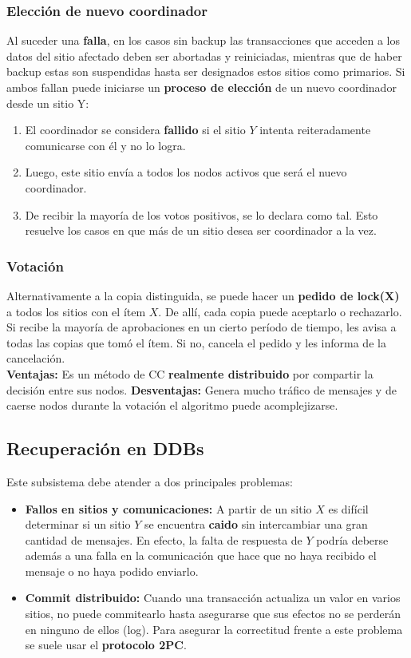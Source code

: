 \subsubsection*{Elección de nuevo coordinador}
Al suceder una \textbf{falla}, en los casos sin backup las transacciones que acceden a los datos del sitio afectado deben ser abortadas y reiniciadas, mientras que de haber backup estas son suspendidas hasta ser designados estos sitios como primarios. Si ambos fallan puede iniciarse un \textbf{proceso de elección} de un nuevo coordinador desde un sitio Y:
\begin{enumerate}
    \item El coordinador se considera \textbf{fallido} si el sitio $Y$ intenta reiteradamente comunicarse con él y no lo logra.
    \item Luego, este sitio envía a todos los nodos activos que será el nuevo coordinador.
    \item De recibir la mayoría de los votos positivos, se lo declara como tal. Esto resuelve los casos en que más de un sitio desea ser coordinador a la vez.
\end{enumerate}

\subsubsection*{Votación}
Alternativamente a la copia distinguida, se puede hacer un \textbf{pedido de lock(X)} a todos los sitios con el ítem $X$. De allí, cada copia puede aceptarlo o rechazarlo. Si recibe la mayoría de aprobaciones en un cierto período de tiempo, les avisa a todas las copias que tomó el ítem. Si no, cancela el pedido y les informa de la cancelación. \\
\textbf{Ventajas:} Es un método de CC \textbf{realmente distribuido} por compartir la decisión entre sus nodos.
\textbf{Desventajas:} Genera mucho tráfico de mensajes y de caerse nodos durante la votación el algoritmo puede acomplejizarse.

\subsection*{Recuperación en DDBs}
Este subsistema debe atender a dos principales problemas:
\begin{itemize}
    \item \textbf{Fallos en sitios y comunicaciones:} A partir de un sitio $X$ es difícil determinar si un sitio $Y$ se encuentra \textbf{caido} sin intercambiar una gran cantidad de mensajes. En efecto, la falta de respuesta de $Y$ podría deberse además a una falla en la comunicación que hace que no haya recibido el mensaje o no haya podido enviarlo.
    \item \textbf{Commit distribuido:} Cuando una transacción actualiza un valor en varios sitios, no puede commitearlo hasta asegurarse que sus efectos no se perderán en ninguno de ellos (log). Para asegurar la correctitud frente a este problema se suele usar el \textbf{protocolo 2PC}.
\end{itemize}

